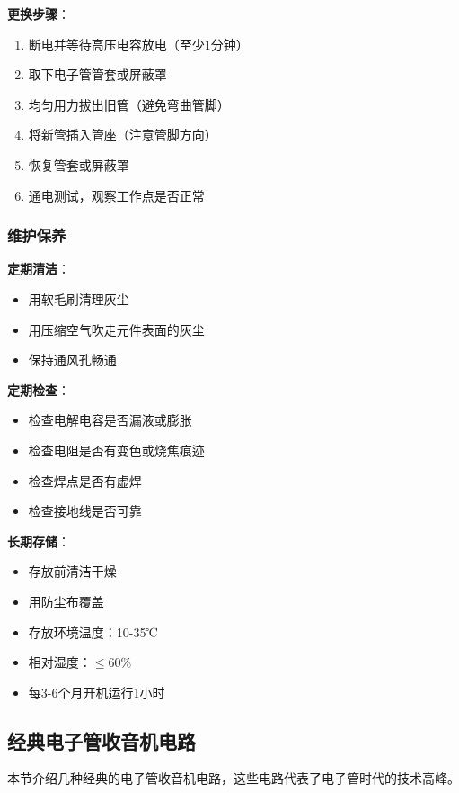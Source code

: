 \textbf{更换步骤}：
\begin{enumerate}
    \item 断电并等待高压电容放电（至少1分钟）
    \item 取下电子管管套或屏蔽罩
    \item 均匀用力拔出旧管（避免弯曲管脚）
    \item 将新管插入管座（注意管脚方向）
    \item 恢复管套或屏蔽罩
    \item 通电测试，观察工作点是否正常
\end{enumerate}

\subsubsection{维护保养}
\label{sec:tube_maintenance}

\textbf{定期清洁}：
\begin{itemize}
    \item 用软毛刷清理灰尘
    \item 用压缩空气吹走元件表面的灰尘
    \item 保持通风孔畅通
\end{itemize}

\textbf{定期检查}：
\begin{itemize}
    \item 检查电解电容是否漏液或膨胀
    \item 检查电阻是否有变色或烧焦痕迹
    \item 检查焊点是否有虚焊
    \item 检查接地线是否可靠
\end{itemize}

\textbf{长期存储}：
\begin{itemize}
    \item 存放前清洁干燥
    \item 用防尘布覆盖
    \item 存放环境温度：10-35℃
    \item 相对湿度：$\leq$60\%
    \item 每3-6个月开机运行1小时
\end{itemize}

\subsection{经典电子管收音机电路}
\label{sec:classic_tube_circuits}

本节介绍几种经典的电子管收音机电路，这些电路代表了电子管时代的技术高峰。

